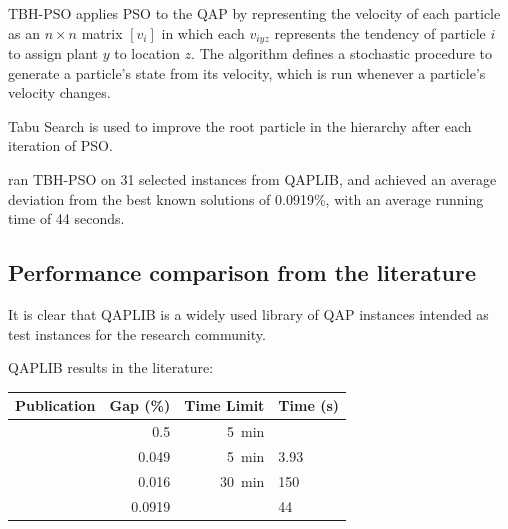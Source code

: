 {	TBH-PSO applies PSO to the QAP by representing the velocity of each particle as an \(n \times n\) matrix \([v_{i}]\) in which each \(v_{iyz}\) represents the tendency of particle \(i\) to assign plant \(y\) to location \(z\).
	The algorithm defines a stochastic procedure to generate a particle's state from its velocity, which is run whenever a particle's velocity changes.

	Tabu Search is used to improve the root particle in the hierarchy after each iteration of PSO.

	\citeauthor{Helal:2015de} ran TBH-PSO on 31 selected instances from QAPLIB, and achieved an average deviation from the best known solutions of 0.0919\%, with an average running time of 44 seconds.
}

\subsection{Performance comparison from the literature} {
    It is clear that QAPLIB \citep{Burkard:1997ve} is a widely used library of QAP instances intended as test instances for the research community.

    QAPLIB results in the literature:
    \begin{tabularx}{1.0\textwidth}{@{}l|rrX@{}}
        \toprule
        Publication & Gap (\%) & Time Limit & Time (s) \\
        \midrule
        \citep{Misevicius:2012dj} & 0.5 & \SI{5}{\minute} &  \\
        \citep{Harris:2015kw} & 0.049 & \SI{5}{\minute} & 3.93 \\
        \citep{Benlic:2015gp} & 0.016 & \SI{30}{\minute} & 150 \\
        \citep{Helal:2015de} & 0.0919 & & 44 \\
        \bottomrule
    \end{tabularx}
}
